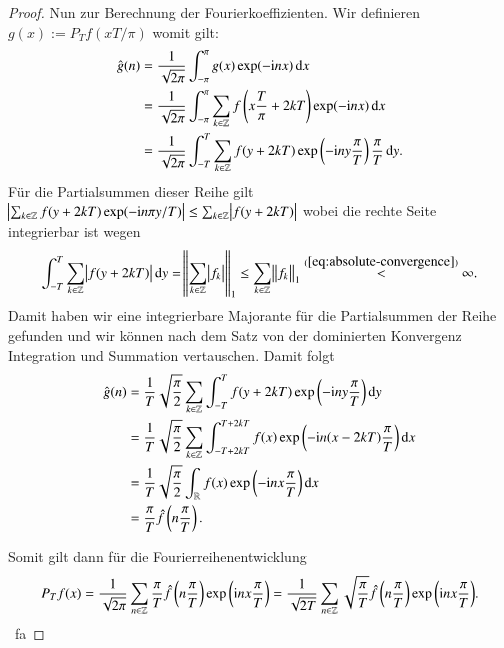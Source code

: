 \begin{proof}
  Nun zur Berechnung der Fourierkoeffizienten. Wir definieren $g(x):=P_T f(xT/\pi)$ womit gilt:
  \begin{equation*}
    \begin{split}
      \fouriertransform{g}(n)
      & =\frac{1}{\sqrt{2\pi}} \int_{-\pi}^\pi{g(x)\exp(-\i nx) \dif x} \\
      & =\frac{1}{\sqrt{2\pi}} \int_{-\pi}^\pi{\sum_{k \in \Z}{f\left(x\frac{T}{\pi} + 2kT\right)} \exp(-\i nx) \dif x} \\
      &= \frac{1}{\sqrt{2\pi}} \int_{-T}^T{\sum_{k \in \Z}{f(y + 2kT)} \exp\left(-\i n y\frac{\pi}{T} \right) \frac{\pi}{T} \dif y}.
    \end{split}
  \end{equation*}
  Für die Partialsummen dieser Reihe gilt $\abs{\sum_{k \in \mathbb{Z}}{f(y+2kT) \exp (-\mathrm{i} n\pi y/T)}} \leq \sum_{k \in \mathbb{Z}}{\abs{f(y+2kT)}}$ wobei die rechte Seite integrierbar ist wegen
  \begin{equation*}
    \int_{-T}^{T}{\sum_{k \in \Z}{\abs{f(y+2kT)}} \dif y}
    = \norm{\sum_{k \in \Z}{\abs{f_k}}}_1
    \leq \sum_{k \in \Z}{\norm{f_k}_1}
    \stackrel{(\ref{eq:absolute-convergence})}{<} \infty.
  \end{equation*}
  Damit haben wir eine integrierbare Majorante für die Partialsummen der Reihe gefunden und wir können nach dem Satz von der dominierten Konvergenz Integration und Summation vertauschen.
  Damit folgt
  \begin{equation*}
    \begin{split}
      \fouriertransform{g}(n)
      &=\frac{1}{T}\sqrt{\frac{\pi}{2}} \sum_{k \in \Z}{\int_{-T}^T{f(y+2kT) \exp\left(-\i n y\frac{\pi}{T}\right) \dif y}} \\
      &=\frac{1}{T} \sqrt{\frac{\pi}{2}} \sum_{k \in \Z}{\int_{-T+2kT}^{T+2kT}{f(x)\exp\left(-\i n (x-2kT)\frac{\pi}{T} \right) \dif x}} \\
      &=\frac{1}{T} \sqrt{\frac{\pi}{2}} \int_\R{f(x) \exp \left(-\i n x\frac{\pi}{T}\right) \dif x} \\
      &= \frac{\pi}{T}\fouriertransform{f}\left(n\frac{\pi}{T}\right).
    \end{split}
  \end{equation*}

  Somit gilt dann für die Fourierreihenentwicklung
  \begin{equation*}
    P_T f(x)
    =\frac{1}{\sqrt{2\pi}}\sum_{n \in \mathbb{Z}}{\frac{\pi}{T} \hat{f}\left(n\frac{\pi}{T}\right) \exp\left(\mathrm{i} n x\frac{\pi}{T}\right)}
    =\frac{1}{\sqrt{2T}}\sum_{n \in \mathbb{Z}}{\sqrt{\frac{\pi}{T}} \hat{f}\left(n \frac{\pi}{T}\right)\exp\left(\mathrm{i} n x\frac{\pi}{T}\right)}.
  \end{equation*}
  \qedhere \ fa
\end{proof}
